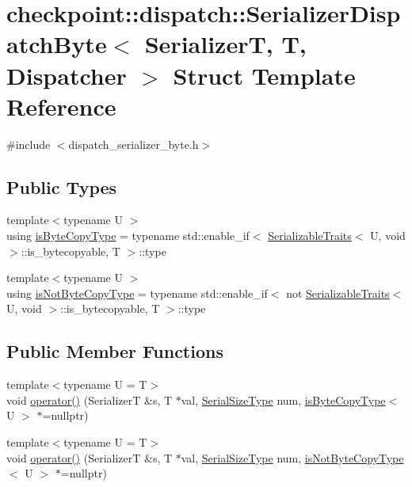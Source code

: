 \hypertarget{structcheckpoint_1_1dispatch_1_1_serializer_dispatch_byte}{}\section{checkpoint\+:\+:dispatch\+:\+:Serializer\+Dispatch\+Byte$<$ SerializerT, T, Dispatcher $>$ Struct Template Reference}
\label{structcheckpoint_1_1dispatch_1_1_serializer_dispatch_byte}


{\ttfamily \#include $<$dispatch\+\_\+serializer\+\_\+byte.\+h$>$}

\subsection*{Public Types}
\begin{DoxyCompactItemize}
\item 
{\footnotesize template$<$typename U $>$ }\\using \hyperlink{structcheckpoint_1_1dispatch_1_1_serializer_dispatch_byte_a6de610e1888790d04dbde87b243d7c7f}{is\+Byte\+Copy\+Type} = typename std\+::enable\+\_\+if$<$ \hyperlink{structcheckpoint_1_1_serializable_traits}{Serializable\+Traits}$<$ U, void $>$\+::is\+\_\+bytecopyable, T $>$\+::type
\item 
{\footnotesize template$<$typename U $>$ }\\using \hyperlink{structcheckpoint_1_1dispatch_1_1_serializer_dispatch_byte_ab1c9cd927c357c30c095356c44252ccd}{is\+Not\+Byte\+Copy\+Type} = typename std\+::enable\+\_\+if$<$ not \hyperlink{structcheckpoint_1_1_serializable_traits}{Serializable\+Traits}$<$ U, void $>$\+::is\+\_\+bytecopyable, T $>$\+::type
\end{DoxyCompactItemize}
\subsection*{Public Member Functions}
\begin{DoxyCompactItemize}
\item 
{\footnotesize template$<$typename U  = T$>$ }\\void \hyperlink{structcheckpoint_1_1dispatch_1_1_serializer_dispatch_byte_ab4417246d499f38e96145a6fe6a61a4d}{operator()} (SerializerT \&s, T $\ast$val, \hyperlink{namespacecheckpoint_a083f6674da3f94c2901b18c6d238217c}{Serial\+Size\+Type} num, \hyperlink{structcheckpoint_1_1dispatch_1_1_serializer_dispatch_byte_a6de610e1888790d04dbde87b243d7c7f}{is\+Byte\+Copy\+Type}$<$ U $>$ $\ast$=nullptr)
\item 
{\footnotesize template$<$typename U  = T$>$ }\\void \hyperlink{structcheckpoint_1_1dispatch_1_1_serializer_dispatch_byte_ac0dc38fad768cc1b4e9b45fc775b36f5}{operator()} (SerializerT \&s, T $\ast$val, \hyperlink{namespacecheckpoint_a083f6674da3f94c2901b18c6d238217c}{Serial\+Size\+Type} num, \hyperlink{structcheckpoint_1_1dispatch_1_1_serializer_dispatch_byte_ab1c9cd927c357c30c095356c44252ccd}{is\+Not\+Byte\+Copy\+Type}$<$ U $>$ $\ast$=nullptr)
\end{DoxyCompactItemize}


